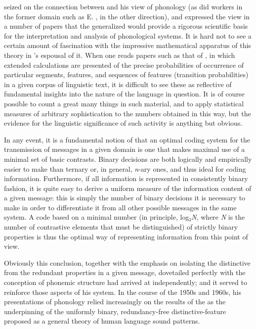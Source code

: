 {\Jakobson} seized on the connection between  and his
view of phonology (as did workers in the former domain such as
E. , in the other direction), and expressed the view in a
number of papers
\citep[e.g.][]{cherry.halle.jakobson53:logical,jakobson61:means-ends}
that the generalized  would
provide a rigorous scientific basis for the interpretation and
analysis of phonological systems. It is hard not to see a certain
amount of fascination with the impressive mathematical apparatus of
this theory in {\Jakobson}'s espousal of it. When one reads papers such
as that of \citet{cherry.halle.jakobson53:logical}, in which extended
calculations are presented of the precise probabilities of occurrence
of particular segments, features, and sequences of features
(transition probabilities) in a given corpus of linguistic text, it is
difficult to see these as reflective of fundamental insights into the
nature of the language in question. It is of course possible to count
a great many things in such material, and to apply statistical
measures of arbitrary sophistication to the numbers obtained in this
way, but the evidence for the linguistic significance of such activity
is anything but obvious.

In any event, it is a fundamental notion of  that an
optimal coding system for the transmission of messages in a given
domain is one that makes maximal use of a minimal set of basic
contrasts. Binary decisions are both logically and empirically easier
to make than ternary or, in general, \emph{n}-ary ones, and thus ideal
for coding information. Furthermore, if all information is represented
in consistently binary fashion, it is quite easy to derive a uniform
measure of the information content of a given message: this is simply
the number of binary decisions it is necessary to make in order to
differentiate it from all other possible messages in the same
system. A code based on a minimal number (in principle, log₂\emph{N},
where \emph{N} is the number of contrastive elements that must be
distinguished) of strictly binary properties is thus the optimal way
of representing information from this point of view.

Obviously this conclusion, together with the emphasis on isolating the
distinctive from the redundant properties in a given message,
dovetailed perfectly with the conception of phonemic structure
{\Jakobson} had arrived at independently; and it served to reinforce
those aspects of his system. In the course of the 1950s and 1960s, his
presentations of phonology relied increasingly on the results of the
 as the underpinning of the
uniformly binary, redundancy-free distinctive-feature 
proposed as a general theory of human language sound patterns.

